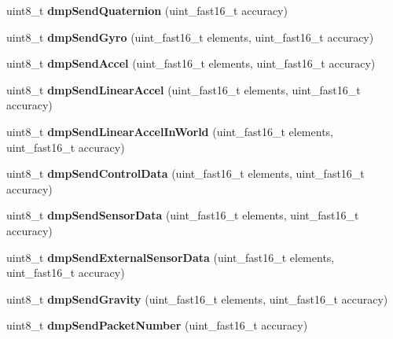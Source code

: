 \begin{DoxyCompactItemize}
uint8\+\_\+t {\bfseries dmp\+Send\+Quaternion} (uint\+\_\+fast16\+\_\+t accuracy)
\item 
\mbox{\label{classMPU6050_a5bc20cd1bebc38fe074e5c0671e5eeef}} 
uint8\+\_\+t {\bfseries dmp\+Send\+Gyro} (uint\+\_\+fast16\+\_\+t elements, uint\+\_\+fast16\+\_\+t accuracy)
\item 
\mbox{\label{classMPU6050_ab9257a8106b4235be0653dd3d1a0fceb}} 
uint8\+\_\+t {\bfseries dmp\+Send\+Accel} (uint\+\_\+fast16\+\_\+t elements, uint\+\_\+fast16\+\_\+t accuracy)
\item 
\mbox{\label{classMPU6050_a4a82e600909d259280493cd83e0ee771}} 
uint8\+\_\+t {\bfseries dmp\+Send\+Linear\+Accel} (uint\+\_\+fast16\+\_\+t elements, uint\+\_\+fast16\+\_\+t accuracy)
\item 
\mbox{\label{classMPU6050_a05e012b160f512cb48e9c15d6b8abd60}} 
uint8\+\_\+t {\bfseries dmp\+Send\+Linear\+Accel\+In\+World} (uint\+\_\+fast16\+\_\+t elements, uint\+\_\+fast16\+\_\+t accuracy)
\item 
\mbox{\label{classMPU6050_a8e2e01f401333d24d8c6dbcaf069dcac}} 
uint8\+\_\+t {\bfseries dmp\+Send\+Control\+Data} (uint\+\_\+fast16\+\_\+t elements, uint\+\_\+fast16\+\_\+t accuracy)
\item 
\mbox{\label{classMPU6050_a8e34dafaffb307b410cb5411eda30d25}} 
uint8\+\_\+t {\bfseries dmp\+Send\+Sensor\+Data} (uint\+\_\+fast16\+\_\+t elements, uint\+\_\+fast16\+\_\+t accuracy)
\item 
\mbox{\label{classMPU6050_a9ab7129881263e634dee0d3b0ca802c4}} 
uint8\+\_\+t {\bfseries dmp\+Send\+External\+Sensor\+Data} (uint\+\_\+fast16\+\_\+t elements, uint\+\_\+fast16\+\_\+t accuracy)
\item 
\mbox{\label{classMPU6050_ad3ac445505589ef21a798f5441f86c7a}} 
uint8\+\_\+t {\bfseries dmp\+Send\+Gravity} (uint\+\_\+fast16\+\_\+t elements, uint\+\_\+fast16\+\_\+t accuracy)
\item 
\mbox{\label{classMPU6050_a92d59a9b70509fec913f86e3ba2788e1}} 
uint8\+\_\+t {\bfseries dmp\+Send\+Packet\+Number} (uint\+\_\+fast16\+\_\+t accuracy)

\end{DoxyCompactItemize}

